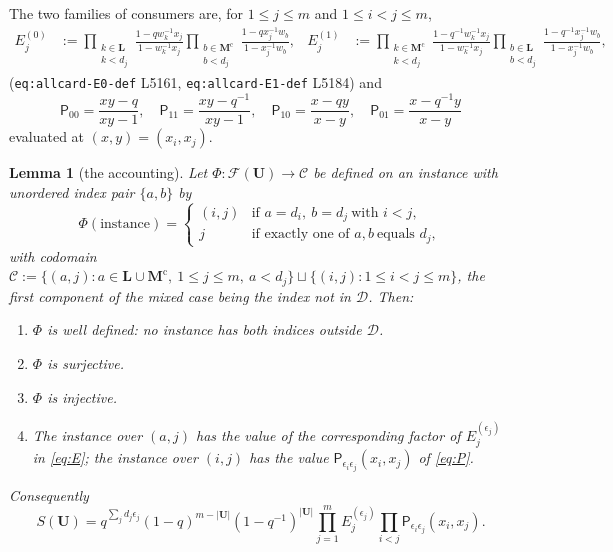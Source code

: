 \documentclass[11pt]{article}
\theoremstyle{plain}
\newtheorem{lem}[thm]{Lemma}
\theoremstyle{definition}
\theoremstyle{remark}
\newcommand{\bM}{\mathbf M}
\newcommand{\bL}{\mathbf L}
\newcommand{\bU}{\mathbf U}
\newcommand{\cD}{\mathcal D}
\newcommand{\cm}{{\mathrm c}}
\begin{document}
The two families of consumers are, for $1\le j\le m$ and $1\le i<j\le m$,
\begin{align}
E_j^{(0)}&:=
\prod_{\substack{k\in\bL\\k<d_j}}\frac{1-qw_k^{-1}x_j}{1-w_k^{-1}x_j}
\prod_{\substack{b\in\bM^\cm\\b<d_j}}\frac{1-qx_j^{-1}w_b}{1-x_j^{-1}w_b},
&
E_j^{(1)}&:=
\prod_{\substack{k\in\bM^\cm\\k<d_j}}\frac{1-q^{-1}w_k^{-1}x_j}{1-w_k^{-1}x_j}
\prod_{\substack{b\in\bL\\b<d_j}}\frac{1-q^{-1}x_j^{-1}w_b}{1-x_j^{-1}w_b},
\label{eq:E}
\end{align}
(\texttt{eq:allcard-E0-def} L5161, \texttt{eq:allcard-E1-def} L5184) and
\begin{equation}
\mathsf P_{00}=\frac{xy-q}{xy-1},\quad
\mathsf P_{11}=\frac{xy-q^{-1}}{xy-1},\quad
\mathsf P_{10}=\frac{x-qy}{x-y},\quad
\mathsf P_{01}=\frac{x-q^{-1}y}{x-y}
\label{eq:P}
\end{equation}
evaluated at $(x,y)=(x_i,x_j)$.

\begin{lem}[the accounting]
\label{lem:account}
Let $\Phi:\mathcal F(\bU)\to\mathcal C$ be defined on an instance with unordered
index pair $\{a,b\}$ by
\[
\Phi(\text{instance})=
\begin{cases}
(i,j) & \text{if }a=d_i,\ b=d_j\ \text{with }i<j,\\
j & \text{if exactly one of }a,b\ \text{equals }d_j,
\end{cases}
\]
with codomain
$\mathcal C:=\bigl\{(a,j):a\in\bL\cup\bM^\cm,\ 1\le j\le m,\ a<d_j\bigr\}
\sqcup\bigl\{(i,j):1\le i<j\le m\bigr\}$, the first component of the mixed case
being the index not in $\cD$. Then:
\begin{enumerate}[label=\textup{(\roman*)},leftmargin=2.2em]
\item $\Phi$ is well defined: no instance has both indices outside $\cD$.
\item $\Phi$ is surjective.
\item $\Phi$ is injective.
\item The instance over $(a,j)$ has the value of the corresponding factor of
$E_j^{(\epsilon_j)}$ in \eqref{eq:E}; the instance over $(i,j)$ has the value
$\mathsf P_{\epsilon_i\epsilon_j}(x_i,x_j)$ of \eqref{eq:P}.
\end{enumerate}
Consequently
\begin{equation}
S(\bU)=q^{\sum_j d_j\epsilon_j}(1-q)^{m-|\bU|}(1-q^{-1})^{|\bU|}
\prod_{j=1}^m E_j^{(\epsilon_j)}\prod_{i<j}\mathsf P_{\epsilon_i\epsilon_j}(x_i,x_j).
\label{eq:factorisation}
\end{equation}
\end{lem}
\end{document}
